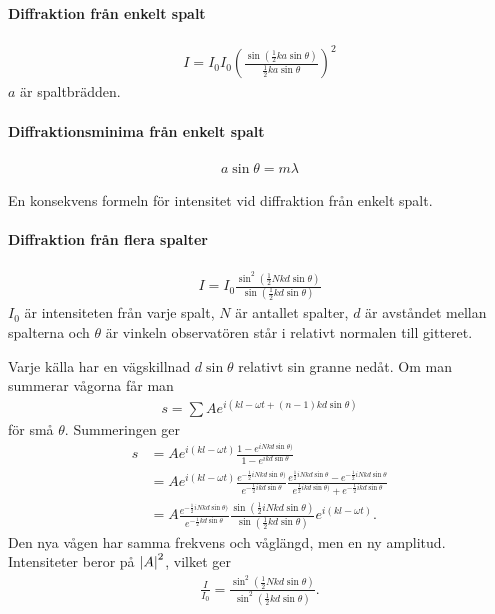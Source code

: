\paragraph{Diffraktion från enkelt spalt}
\begin{align*}
	I = I_0I_0\left(\frac{\sin{\left(\frac{1}{2}ka\sin{\theta}\right)}}{\frac{1}{2}ka\sin{\theta}}\right)^2
\end{align*}
$a$ är spaltbrädden.

\deriv

\paragraph{Diffraktionsminima från enkelt spalt}
\begin{align*}
	a\sin{\theta} = m\lambda
\end{align*}

\deriv
En konsekvens formeln för intensitet vid diffraktion från enkelt spalt.

\paragraph{Diffraktion från flera spalter}
\begin{align*}
	I = I_0\frac{\sin^2{\left(\frac{1}{2}Nkd\sin{\theta}\right)}}{\sin{\left(\frac{1}{2}kd\sin{\theta}\right)}}
\end{align*}
$I_0$ är intensiteten från varje spalt, $N$ är antallet spalter, $d$ är avståndet mellan spalterna och $\theta$ är vinkeln observatören står i relativt normalen till gitteret.

\deriv
Varje källa har en vägskillnad $d\sin{\theta}$ relativt sin granne nedåt. Om man summerar vågorna får man
\begin{align*}
	s = \sum Ae^{i(kl - \omega t + (n -1)kd\sin{\theta})}
\end{align*}
för små $\theta$. Summeringen ger
\begin{align*}
	s &= Ae^{i(kl - \omega t)}\frac{1 - e^{iNkd\sin{\theta})}}{1 - e^{ikd\sin{\theta}}} \\
	  &= Ae^{i(kl - \omega t)}\frac{e^{-\frac{1}{2}iNkd\sin{\theta})}}{e^{-\frac{1}{2}ikd\sin{\theta}}}\frac{e^{\frac{1}{2}iNkd\sin{\theta}} - e^{-\frac{1}{2}iNkd\sin{\theta}}}{e^{\frac{1}{2}ikd\sin{\theta})} + e^{-\frac{1}{2}ikd\sin{\theta}}} \\
	  &= A\frac{e^{-\frac{1}{2}iNkd\sin{\theta})}}{e^{-\frac{1}{2}kd\sin{\theta}}}\frac{\sin{\left(\frac{1}{2}iNkd\sin{\theta}\right)}}{\sin{\left(\frac{1}{2}kd\sin{\theta}\right)}}e^{i(kl - \omega t)}.
\end{align*}
Den nya vågen har samma frekvens och våglängd, men en ny amplitud. Intensiteter beror på $\abs{A}^2$, vilket ger
\begin{align*}
	\frac{I}{I_0} = \frac{\sin^2{\left(\frac{1}{2}Nkd\sin{\theta}\right)}}{\sin^2{ \left(\frac{1}{2}kd\sin{\theta}\right)}}.
\end{align*}

